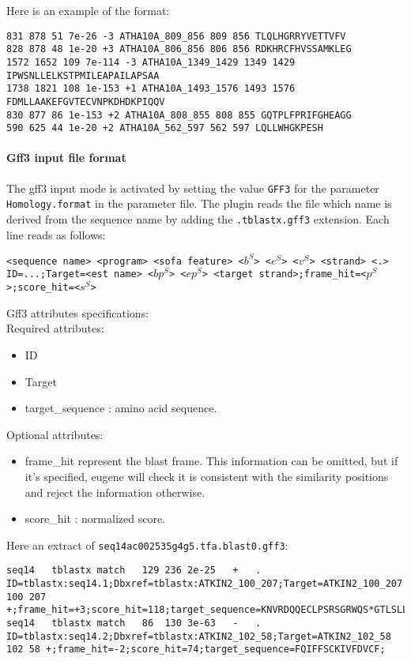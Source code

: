 Here is an example of the format:
\begin{Verbatim}[fontsize=\small]
831 878 51 7e-26 -3 ATHA10A_809_856 809 856 TLQLHGRRYVETTVFV
828 878 48 1e-20 +3 ATHA10A_806_856 806 856 RDKHRCFHVSSAMKLEG
1572 1652 109 7e-114 -3 ATHA10A_1349_1429 1349 1429 IPWSNLLELKSTPMILEAPAILAPSAA
1738 1821 108 1e-153 +1 ATHA10A_1493_1576 1493 1576 FDMLLAAKEFGVTECVNPKDHDKPIQQV
830 877 86 1e-153 +2 ATHA10A_808_855 808 855 GQTPLFPRIFGHEAGG
590 625 44 1e-20 +2 ATHA10A_562_597 562 597 LQLLWHGKPESH
\end{Verbatim}

\paragraph{Gff3 input file format}

The gff3 input mode is activated by setting the value \texttt{GFF3}
for the parameter \texttt{Homology.format} in the parameter file.  The
plugin reads the file which name is derived from the sequence name by
adding the \texttt{.tblastx.gff3} extension. Each line reads as follows:

\texttt{<sequence name> <program> <sofa feature> <$b^S$> <$e^S$> <$v^S$> <strand> <.> ID=...;Target=<est name> <$bp^S$> <$ep^S$> <target strand>;frame\_hit=<$p^S$>;score\_hit=<$s^S$>}

Gff3 attributes specifications:\\
Required attributes:\\ 
	\begin{itemize}
	\item ID
	\item Target
	\item target\_sequence : amino acid sequence.
	\end{itemize}

Optional attributes:\\ 
	\begin{itemize}
	\item frame\_hit represent the blast frame.  This information
          can be omitted, but if it's specified, eugene will check it
          is consistent with the similarity positions and reject the
          information otherwise.
	\item score\_hit :  normalized score.
	\end{itemize}


Here an extract of \texttt{seq14ac002535g4g5.tfa.blast0.gff3}:
\begin{Verbatim}[fontsize=\tiny]
seq14	tblastx	match	129	236	2e-25	+	.	ID=tblastx:seq14.1;Dbxref=tblastx:ATKIN2_100_207;Target=ATKIN2_100_207 100 207 +;frame_hit=+3;score_hit=118;target_sequence=KNVRDQQECLPSRSGRWQS*GTLSLLEQSTDRLFKL;
seq14	tblastx	match	86	130	3e-63	-	.	ID=tblastx:seq14.2;Dbxref=tblastx:ATKIN2_102_58;Target=ATKIN2_102_58 102 58 +;frame_hit=-2;score_hit=74;target_sequence=FQIFFSCKIVFDVCF;
\end{Verbatim}

